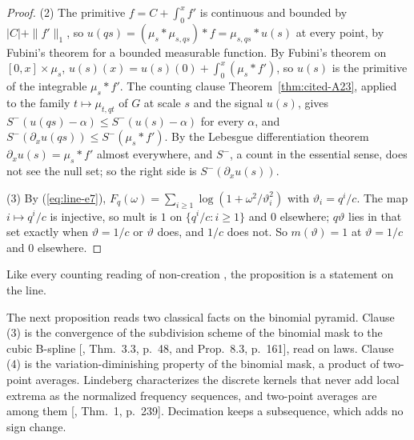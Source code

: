 \begin{proof}
(2) The primitive $f = C + \int_0^xf'$ is continuous and bounded by $|C| + \|f'\|_1$, so
$u(qs) = (\mu_s * \mu_{s,qs}) * f = \mu_{s,qs} * u(s)$ at every point, by Fubini's theorem for a
bounded measurable function. By Fubini's theorem on $[0,x] \times \mu_s$,
$u(s)(x) = u(s)(0) + \int_0^x(\mu_s * f')$, so $u(s)$ is the primitive of the integrable
$\mu_s * f'$. The counting clause Theorem~\ref{thm:cited-A23}, applied to the family $t \mapsto \mu_{t,qt}$ of $G$ at scale $s$
and the signal $u(s)$, gives $S^-(u(qs) - \alpha) \le S^-(u(s) - \alpha)$ for every $\alpha$, and
$S^-(\partial_xu(qs)) \le S^-(\mu_s * f')$. By the Lebesgue differentiation theorem
$\partial_xu(s) = \mu_s * f'$ almost everywhere, and $S^-$, a count in the essential sense, does not
see the null set; so the right side is $S^-(\partial_xu(s))$.

(3) By (\ref{eq:line-e7}), $F_q(\omega) = \sum_{i \ge 1}\log(1 + \omega^2/\vartheta_i^2)$ with
$\vartheta_i = q^i/c$. The map $i \mapsto q^i/c$ is injective, so $\mathrm{mult}$ is $1$ on $\{q^i/c : i \ge 1\}$
and $0$ elsewhere; $q\vartheta$ lies in that set exactly when $\vartheta = 1/c$ or $\vartheta$ does,
and $1/c$ does not. So $m(\vartheta) = 1$ at $\vartheta = 1/c$ and $0$ elsewhere.
\end{proof}

Like every counting reading of non-creation , the proposition
is a statement on the line.

The next proposition reads two classical facts on the binomial pyramid. Clause (3) is the
convergence of the subdivision scheme of the binomial mask to the cubic B-spline
[, Thm.~3.3, p.~48, and Prop.~8.3, p.~161], read on laws. Clause (4)
is the variation-diminishing property of the binomial mask, a product of two-point averages.
Lindeberg characterizes the discrete kernels that never add local extrema as the normalized
\Polya{} frequency sequences, and two-point averages are among them
[, Thm.~1, p.~239]. Decimation keeps a subsequence, which adds no
sign change.

